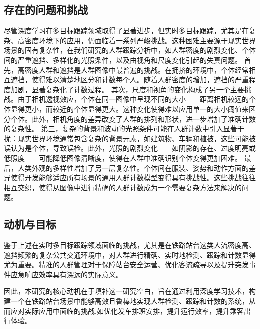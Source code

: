 \subsection{存在的问题和挑战}
尽管深度学习在多目标跟踪领域取得了显著进步，但实时多目标跟踪，尤其是在复杂、高密度环境下的应用，仍面临着一系列严峻挑战。这种困难主要源于现实世界场景的固有复杂性，在我们研究的人群跟踪分析中，如人群密度的剧烈变化、个体间的严重遮挡、多样化的光照条件，以及由视角和尺度变化引起的失真问题\cite{30_khan_passenger_2020}\cite{01_noauthor_deep_2024}\cite{66_zhang_bus_2020}。
首先，高密度人群和遮挡是人群图像中最普遍的挑战。在拥挤的环境中，个体经常相互遮挡，使得难以清楚地区分和计数每个人。随着人群密度的增加，遮挡的严重程度加剧，显著复杂化了计数过程\cite{33or34_li_lightweight_2023}\cite{30_khan_passenger_2020}\cite{01_noauthor_deep_2024}。
其次，尺度和视角的变化构成了另一个主要挑战。由于相机透视效应，个体在同一图像中呈现不同的大小——距离相机较远的个体显得更小，而较近的个体显得更大。这种变化使得难以应用单一的大小阈值来区分个体。此外，相机角度的差异改变了人群的排列和形状，进一步增加了准确计数的复杂性\cite{29_kaur_systematic_2024}\cite{30_khan_passenger_2020}。
第三，复杂的背景和波动的光照条件可能在人群计数中引入显著干扰：现实世界环境通常包含复杂的背景元素，如建筑物、车辆和植被，这些可能被误认为是个体，导致误检。此外，光照的剧烈变化——如阴影的存在、过度明亮或低照度——可能降低图像清晰度，使得在人群中准确识别个体变得更加困难\cite{33or34_li_lightweight_2023}\cite{30_khan_passenger_2020}。
最后，人类外观的多样性增加了另一层复杂性。个体间在服装、姿势和动作方面的差异\cite{33or34_li_lightweight_2023}\cite{66_zhang_bus_2020}\cite{30_khan_passenger_2020}\cite{01_noauthor_deep_2024}使得开发能够适应所有场景的通用人群计数模型变得具有挑战性。这些挑战往往相互交织，使得从图像中进行精确的人群计数成为一个需要复杂方法来解决的问题。

\subsection{动机与目标}

鉴于上述在实时多目标跟踪领域面临的挑战，尤其是在铁路站台这类人流密度高、遮挡频繁的复杂公共交通环境中，对人群进行精确、实时地检测、跟踪和计数显得尤为重要。精准的人群管理对于保障站台安全运营\cite{214}、优化客流疏导\cite{215}以及提升突发事件应急响应效率\cite{216}具有深远的实际意义。

因此，本研究的核心动机在于填补这一研究空白，旨在通过利用深度学习技术，构建一个在铁路站台场景中能够高效且鲁棒地实现人群检测、跟踪和计数的系统，从而应对实际应用中面临的挑战,如优化发车排班安排，提升运行效率，提升乘客出行体验。

